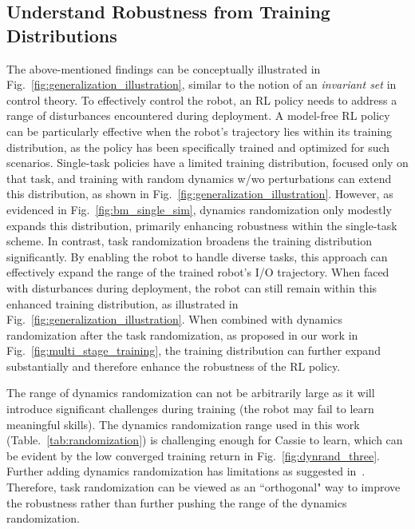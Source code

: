 \subsection{Understand Robustness from Training Distributions}
The above-mentioned findings can be conceptually illustrated in Fig.~\ref{fig:generalization_illustration}, similar to the notion of an \emph{invariant set} in control theory. 
To effectively control the robot, an RL policy needs to address a range of disturbances encountered during deployment. 
A model-free RL policy can be particularly effective when the robot's trajectory lies within its training distribution, as the policy has been specifically trained and optimized for such scenarios.
Single-task policies have a limited training distribution, focused only on that task, and training with random dynamics w/wo perturbations can extend this distribution, as shown in Fig.~\ref{fig:generalization_illustration}.
However, as evidenced in Fig.~\ref{fig:bm_single_sim}, dynamics randomization only modestly expands this distribution, primarily enhancing robustness within the single-task scheme.
In contrast, task randomization broadens the training distribution significantly. 
By enabling the robot to handle diverse tasks, this approach can effectively expand the range of the trained robot's I/O trajectory. 
When faced with disturbances during deployment, the robot can still remain within this enhanced training distribution, as illustrated in Fig.~\ref{fig:generalization_illustration}.
When combined with dynamics randomization after the task randomization, as proposed in our work in Fig.~\ref{fig:multi_stage_training}, the training distribution can further expand substantially and therefore enhance the robustness of the RL policy.






\begin{remark}
    The range of dynamics randomization can not be arbitrarily large as it will introduce significant challenges during training (the robot may fail to learn meaningful skills). The dynamics randomization range used in this work (Table.~\ref{tab:randomization}) is challenging enough for Cassie to learn, which can be evident by the low converged training return in Fig.~\ref{fig:dynrand_three}. Further adding dynamics randomization has limitations as suggested in~\cite{xie2021dynamics}. Therefore, task randomization can be viewed as an “orthogonal" way to improve the robustness rather than further pushing the range of the dynamics randomization. 
\end{remark}




